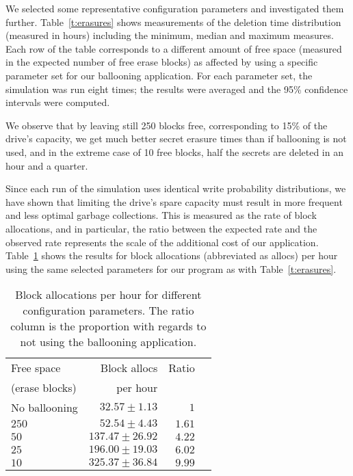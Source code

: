 \documentclass{acmtog}
\begin{document}
We selected some representative configuration parameters and investigated them further.
Table~\ref{t:erasures} shows measurements of the deletion time distribution
(measured in hours) including the minimum, median and maximum measures. 
Each row of the table corresponds to a different amount of
free space (measured in the expected number of free erase blocks) as
affected by using a specific parameter set for our ballooning application. 
For each parameter set, the simulation was run eight times; the results were averaged and 
the 95\% confidence intervals were computed. 

We observe
that by leaving still 250 blocks free, corresponding to 15\% of the drive's
capacity,  we get much better secret
erasure times than if ballooning is not used, and in the extreme case of 10 free blocks,
half the secrets are deleted in an hour and a quarter.  

Since each run of the simulation uses identical write probability distributions,
we have
shown that limiting the drive's spare capacity must result in more frequent and less optimal
garbage collections. This is measured as the rate of block allocations, and in
particular, the ratio between the expected rate and the
observed rate represents the scale of the additional cost of our application.
Table~\ref{t:allocations} shows the results for block allocations (abbreviated
as allocs) per hour
using the same selected parameters for our program as with
Table~\ref{t:erasures}.


\begin{table}[t]
\centering
\begin{tabular}{lrrr}
\hline
Free space   & Block allocs & Ratio  \\
(erase blocks)  & per hour&  \\
\hline
No ballooning & $ 32.57 \pm 1.13 $ &  $1$  \\
$ 250$ & $ 52.54 \pm 4.43 $ & $ 1.61 $  \\


$ 50$ &  $ 137.47 \pm 26.92 $ & $4.22$  \\ 
$ 25$ & $ 196.00 \pm 19.03 $ & $ 6.02 $   \\
$ 10$ & $325.37 \pm 36.84$ & $9.99$  \\



\hline

\end{tabular}
\caption{\small Block allocations per hour for different configuration
parameters. The
ratio column is the proportion with regards to not using the ballooning
application.
\label{t:allocations}\normalsize}
\end{table}
\end{document}
